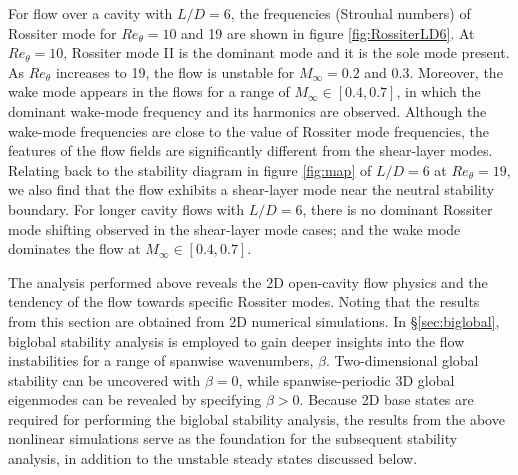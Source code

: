 \documentclass{jfm}
\begin{document}
For flow over a cavity with $L/D = 6$, the frequencies (Strouhal numbers) of Rossiter mode for $Re_\theta=10$ and 19 are shown in figure \ref{fig:RossiterLD6}. At $Re_\theta = 10$, Rossiter mode II is the dominant mode and it is the sole mode present. As $Re_\theta$ increases to 19, the flow is unstable for $M_\infty=0.2$ and 0.3. Moreover, the wake mode appears in the flows for a range of $M_\infty\in[0.4,0.7]$, in which the dominant wake-mode frequency and its harmonics are observed. Although the wake-mode frequencies are close to the value of Rossiter mode frequencies, the features of the flow fields are significantly different from the shear-layer modes. Relating back to the stability diagram in figure \ref{fig:map} of $L/D=6$ at $Re_\theta=19$, we also find that the flow exhibits a shear-layer mode near the neutral stability boundary.  For longer cavity flows with $L/D=6$, there is no dominant Rossiter mode shifting observed in the shear-layer mode cases; and the wake mode dominates the flow at $M_\infty \in[0.4,0.7]$.

The analysis performed above reveals the 2D open-cavity flow physics and the tendency of the flow towards specific Rossiter modes. Noting that the results from this section are obtained from 2D numerical simulations. In \S \ref{sec:biglobal}, biglobal stability analysis is employed to gain deeper insights into the flow instabilities for a range of spanwise wavenumbers, $\beta$. Two-dimensional global stability can be uncovered with $\beta=0$, while spanwise-periodic 3D global eigenmodes can be revealed by specifying $\beta>0$. Because 2D base states are required for performing the biglobal stability analysis, the results from the above nonlinear simulations serve as the foundation for the subsequent stability analysis, in addition to the unstable steady states discussed below.

 
\end{document}
